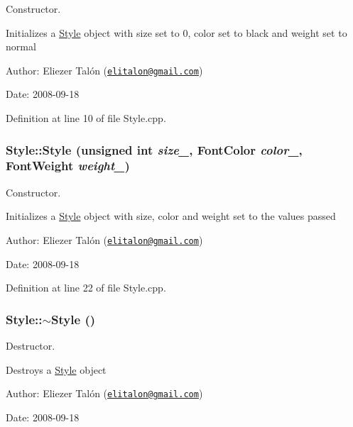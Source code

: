 Constructor. 

Initializes a \hyperlink{class_style}{Style} object with size set to 0, color set to black and weight set to normal

\begin{Desc}
\item[Author:]Eliezer Talón (\href{mailto:elitalon@gmail.com}{\tt elitalon@gmail.com}) \end{Desc}
\begin{Desc}
\item[Date:]2008-09-18 \end{Desc}


Definition at line 10 of file Style.cpp.\hypertarget{class_style_1d6e412d4343b4a6eb4253b6456928b6}{
\subsubsection[Style]{\setlength{\rightskip}{0pt plus 5cm}Style::Style (unsigned int {\em size\_\-}, \/  {\bf FontColor} {\em color\_\-}, \/  {\bf FontWeight} {\em weight\_\-})}}
\label{class_style_1d6e412d4343b4a6eb4253b6456928b6}


Constructor. 

Initializes a \hyperlink{class_style}{Style} object with size, color and weight set to the values passed

\begin{Desc}
\item[Author:]Eliezer Talón (\href{mailto:elitalon@gmail.com}{\tt elitalon@gmail.com}) \end{Desc}
\begin{Desc}
\item[Date:]2008-09-18 \end{Desc}


Definition at line 22 of file Style.cpp.\hypertarget{class_style_7c798ef9b77bc94719542feade497725}{
\subsubsection[$\sim$Style]{\setlength{\rightskip}{0pt plus 5cm}Style::$\sim$Style ()}}
\label{class_style_7c798ef9b77bc94719542feade497725}


Destructor. 

Destroys a \hyperlink{class_style}{Style} object

\begin{Desc}
\item[Author:]Eliezer Talón (\href{mailto:elitalon@gmail.com}{\tt elitalon@gmail.com}) \end{Desc}
\begin{Desc}
\item[Date:]2008-09-18 \end{Desc}


